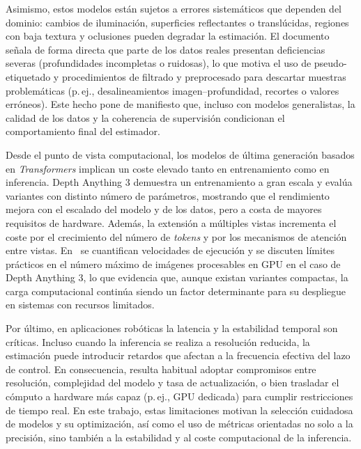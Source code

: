     Asimismo, estos modelos están sujetos a errores sistemáticos que dependen del dominio: cambios de iluminación, superficies reflectantes 
    o translúcidas, regiones con baja textura y oclusiones pueden degradar la estimación. El documento señala de forma directa que parte de 
    los datos reales presentan deficiencias severas (profundidades incompletas o ruidosas), lo que motiva el uso de pseudo-etiquetado y 
    procedimientos de filtrado y preprocesado para descartar muestras problemáticas (p.\,ej., desalineamientos imagen--profundidad, recortes 
    o valores erróneos). Este hecho pone de manifiesto que, incluso con modelos generalistas, la calidad de los datos y la coherencia de 
    supervisión condicionan el comportamiento final del estimador.

    Desde el punto de vista computacional, los modelos de última generación basados en \textit{Transformers} implican un coste elevado tanto 
    en entrenamiento como en inferencia. Depth Anything 3 demuestra un entrenamiento a gran escala y evalúa variantes con distinto número de 
    parámetros, mostrando que el rendimiento mejora con el escalado del modelo y de los datos, pero a costa de mayores requisitos de 
    hardware. Además, la extensión a múltiples vistas incrementa el coste por el crecimiento del número de \textit{tokens} y por los 
    mecanismos de atención entre vistas. En~\cite{overview-da} se cuantifican velocidades de ejecución y se discuten límites prácticos en el número 
    máximo de imágenes procesables en GPU en el caso de Depth Anything 3, lo que evidencia que, aunque existan variantes 
    compactas, la carga computacional continúa siendo un factor determinante para su despliegue en sistemas con recursos limitados.

    Por último, en aplicaciones robóticas la latencia y la estabilidad temporal son críticas. Incluso cuando la inferencia se realiza a 
    resolución reducida, la estimación puede introducir retardos que afectan a la frecuencia efectiva del lazo de control. En consecuencia, 
    resulta habitual adoptar compromisos entre resolución, complejidad del modelo y tasa de actualización, o bien trasladar el cómputo a 
    hardware más capaz (p.\,ej., GPU dedicada) para cumplir restricciones de tiempo real. En este trabajo, estas limitaciones motivan la 
    selección cuidadosa de modelos y su optimización, así como el uso de métricas orientadas no solo a la precisión, sino también a la 
    estabilidad y al coste computacional de la inferencia.
